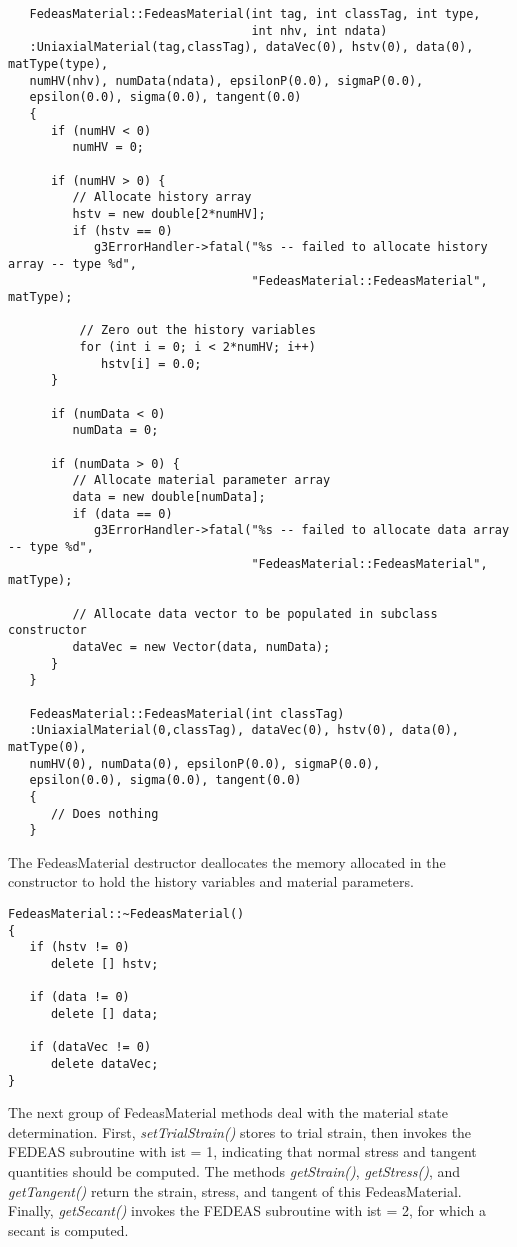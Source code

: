 \documentclass[12pt]{article}
\begin{document}
{\sf\small
\begin{verbatim}
   FedeasMaterial::FedeasMaterial(int tag, int classTag, int type,
                                  int nhv, int ndata)
   :UniaxialMaterial(tag,classTag), dataVec(0), hstv(0), data(0), matType(type),
   numHV(nhv), numData(ndata), epsilonP(0.0), sigmaP(0.0),
   epsilon(0.0), sigma(0.0), tangent(0.0)
   {
      if (numHV < 0)
         numHV = 0;

      if (numHV > 0) {
         // Allocate history array
         hstv = new double[2*numHV];
         if (hstv == 0)
            g3ErrorHandler->fatal("%s -- failed to allocate history array -- type %d",
                                  "FedeasMaterial::FedeasMaterial", matType);
		
          // Zero out the history variables
          for (int i = 0; i < 2*numHV; i++)
             hstv[i] = 0.0;
      }

      if (numData < 0)
         numData = 0;

      if (numData > 0) {
         // Allocate material parameter array
         data = new double[numData];
         if (data == 0)
            g3ErrorHandler->fatal("%s -- failed to allocate data array -- type %d",
                                  "FedeasMaterial::FedeasMaterial", matType);

         // Allocate data vector to be populated in subclass constructor
         dataVec = new Vector(data, numData);
      }
   }

   FedeasMaterial::FedeasMaterial(int classTag)
   :UniaxialMaterial(0,classTag), dataVec(0), hstv(0), data(0), matType(0),
   numHV(0), numData(0), epsilonP(0.0), sigmaP(0.0),
   epsilon(0.0), sigma(0.0), tangent(0.0)
   {
      // Does nothing
   }
\end{verbatim}
}

\noindent The FedeasMaterial destructor deallocates the memory allocated in the constructor
to hold the history variables and material parameters.

{\sf\small
\begin{verbatim}
FedeasMaterial::~FedeasMaterial()
{
   if (hstv != 0)
      delete [] hstv;

   if (data != 0)
      delete [] data;

   if (dataVec != 0)
      delete dataVec;
}
\end{verbatim}
}

\noindent The next group of FedeasMaterial methods deal with the material state determination.
First, {\em setTrialStrain()} stores to trial strain, then invokes the FEDEAS subroutine with ist = 1,
indicating that normal stress and tangent quantities should be computed. The methods {\em getStrain()},
{\em getStress()}, and {\em getTangent()} return the strain, stress, and tangent of this FedeasMaterial.
Finally, {\em getSecant()} invokes the FEDEAS subroutine with ist = 2, for which a secant is computed.
\end{document}
